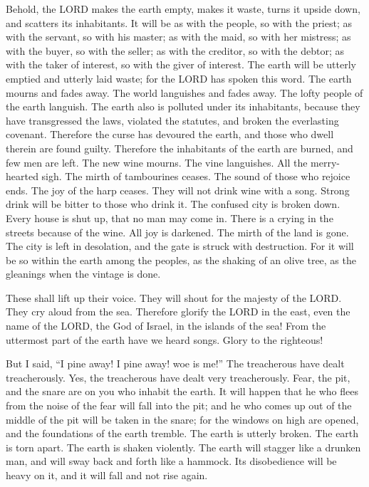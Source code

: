 \mychapter{} \myverse*{}Behold, the LORD makes the earth empty, makes it waste, turns
it upside down, and scatters its inhabitants.
\myverse{}It will be as with the people, so with the priest; as with the servant, so
with his master; as with the maid, so with her mistress; as with the buyer, so with the seller; as with
the creditor, so with the debtor; as with the taker of interest, so with the giver of interest.
\myverse{}The earth will be utterly emptied and utterly laid waste; for the LORD has
spoken this word.
\myverse{}The earth mourns and fades away. The world languishes and fades away. The lofty
people of the earth languish.
\myverse{}The earth also is polluted under its inhabitants, because they have transgressed
the laws, violated the statutes, and broken the everlasting covenant.
\myverse{}Therefore the curse has devoured the earth, and those who dwell therein are
found guilty. Therefore the inhabitants of the earth are burned, and few men are left.
\myverse{}The new wine mourns. The vine languishes. All the merry-hearted sigh.
\myverse{}The mirth of tambourines ceases. The sound of those who rejoice ends. The joy
of the harp ceases.
\myverse{}They will not drink wine with a song. Strong drink will be bitter to those
who drink it.
\myverse{}The confused city is broken down. Every house is shut up, that no man may
come in.
\myverse{}There is a crying in the streets because of the wine. All joy is darkened.
The mirth of the land is gone.
\myverse{}The city is left in desolation, and the gate is struck with destruction.
\myverse{}For it will be so within the earth among the peoples, as the shaking of an
olive tree, as the gleanings when the vintage is done.

\myverse{}These shall lift up their voice. They will shout for the majesty
of the LORD. They cry aloud from the sea.
\myverse{}Therefore glorify the LORD in the east, even the name of the LORD, the God
of Israel, in the islands of the sea!
\myverse{}From the uttermost part of the earth have we heard songs. Glory to the righteous!

But I said, “I pine away! I pine away! woe is me!” The treacherous have dealt treacherously.
Yes, the treacherous have dealt very treacherously.
\myverse{}Fear, the pit, and the snare are on you who inhabit the earth.
\myverse{}It will happen that he who flees from the noise of the fear will fall into
the pit; and he who comes up out of the middle of the pit will be taken in the snare; for the windows
on high are opened, and the foundations of the earth tremble.
\myverse{}The earth is utterly broken. The earth is torn apart. The earth is shaken
violently.
\myverse{}The earth will stagger like a drunken man, and will sway back and forth like
a hammock. Its disobedience will be heavy on it, and it will fall and not rise again.

